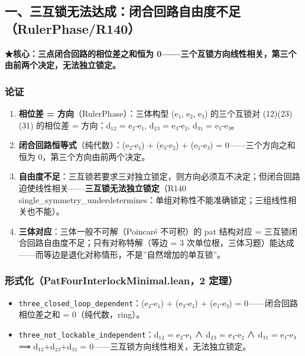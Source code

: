 \documentclass[
]{article}
\providecommand{\tightlist}{%
 \setlength{\itemsep}{0pt}\setlength{\parskip}{0pt}}
\begin{document}
\subsection{一、三互锁无法达成：闭合回路自由度不足（RulerPhase/R140）}\label{ux4e00ux4e09ux4e92ux9501ux65e0ux6cd5ux8fbeux6210ux95edux5408ux56deux8defux81eaux7531ux5ea6ux4e0dux8db3rulerphaser140}

\textbf{★核心：三点闭合回路的相位差之和恒为
0------三个互锁方向线性相关，第三个由前两个决定，无法独立锁定。}

\subsubsection{论证}\label{ux8bbaux8bc1}

\begin{enumerate}
\def\labelenumi{\arabic{enumi}.}
\tightlist
\item
 \textbf{相位差 = 方向}（RulerPhase）：三体构型 (e₁, e₂, e₃)
 的三个互锁对 (12)(23)(31) 的相位差 = 方向：d₁₂ = e₂-e₁, d₂₃ = e₃-e₂,
 d₃₁ = e₁-e₃。
\item
 \textbf{闭合回路恒等式}（纯代数）：(e₂-e₁) + (e₃-e₂) + (e₁-e₃) =
 0------三个方向之和恒为 0，第三个方向由前两个决定。
\item
 \textbf{自由度不足}：三互锁若要求三对独立锁定，则方向必须互不决定；但闭合回路迫使线性相关------\textbf{三互锁无法独立锁定}（R140
 single\_symmetry\_underdetermines：单组对称性不能准确锁定；三组线性相关也不能）。
\item
 \textbf{三体对应}：三体一般不可解（Poincaré 不可积）的 pat 结构对应 =
 三互锁闭合回路自由度不足；只有对称特解（等边 = 3
 次单位根，三体习题）能达成------而等边是退化对称情形，不是''自然增加的单互锁''。
\end{enumerate}

\subsubsection{形式化（PatFourInterlockMinimal.lean，2
定理）}\label{ux5f62ux5f0fux5316patfourinterlockminimal.lean2-ux5b9aux7406}

\begin{itemize}
\tightlist
\item
 \texttt{three\_closed\_loop\_dependent}：(e₂-e₁) + (e₃-e₂) + (e₁-e₃) =
 0------闭合回路相位差之和 = 0（纯代数，ring）。
\item
 \texttt{three\_not\_lockable\_independent}：d₁₂ = e₂-e₁ ∧ d₂₃ = e₃-e₂
 ∧ d₃₁ = e₁-e₃ ⟹ d₁₂+d₂₃+d₃₁ =
 0------三互锁方向线性相关，无法独立锁定。
\end{itemize}
\end{document}
